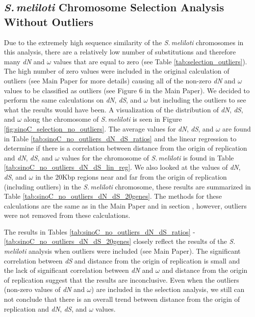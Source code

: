 \documentclass[12pt]{article}
\newcommand{\smel}{\textit{S.\,meliloti}\xspace}
\newcommand{\dn}{\textit{dN}\xspace}
\newcommand{\ds}{\textit{dS}\xspace}
\begin{document}
\subsection{\smel Chromosome Selection Analysis Without Outliers}
Due to the extremely high sequence similarity of the \smel chromosomes in this analysis, there are a relatively low number of substitutions and therefore many \dn and $\omega$ values that are equal to zero (see Table \ref{tab:selection_outliers}).
The high number of zero values were included in the original calculation of outliers (see Main Paper for more details) causing all of the non-zero \dn and $\omega$ values to be classified as outliers (see Figure 6 in the Main Paper).
We decided to perform the same calculations on \dn, \ds, and $\omega$ but including the outliers to see what the results would have been.
A visualization of the distribution of \dn, \ds, and $\omega$ along the chromosome of \smel is seen in Figure \ref{fig:sinoC_selection_no_outliers}.
The average values for \dn, \ds, and $\omega$ are found in Table \ref{tab:sinoC_no_outliers_dN_dS_ratios} and the linear regression to determine if there is a correlation between distance from the origin of replication and \dn, \ds, and $\omega$ values for the chromosome of \smel is found in Table \ref{tab:sinoC_no_outliers_dN_dS_lin_reg}.
We also looked at the values of \dn, \ds, and $\omega$ in the 20Kbp regions near and far from the origin of replication (including outliers) in the \smel chromosome, these results are summarized in Table \ref{tab:sinoC_no_outliers_dN_dS_20genes}.
The methods for these calculations are the same as in the Main Paper and in section , however, outliers were not removed from these calculations.

The results in Tables \ref{tab:sinoC_no_outliers_dN_dS_ratios} - \ref{tab:sinoC_no_outliers_dN_dS_20genes} closely reflect the results of the \smel analysis when outliers were included (see Main Paper).
The significant correlation between \ds and distance from the origin of replication is small and the lack of significant correlation between \dn and $\omega$ and distance from the origin of replication suggest that the results are inconclusive.
Even when the outliers (non-zero values of \dn and $\omega$) are included in the selection analysis, we still can not conclude that there is an overall trend between distance from the origin of replication and \dn, \ds, and $\omega$ values.
\end{document}
